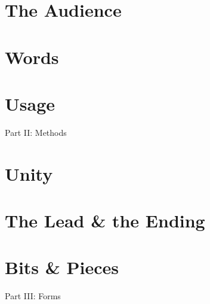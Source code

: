\documentclass{article}
\begin{document}
\section{The Audience}


\section{Words}


\section{Usage}


\begin{center}\huge
	Part II: Methods
\end{center}


\section{Unity}


\section{The Lead \& the Ending}


\section{Bits \& Pieces}


\begin{center}\huge
	Part III: Forms
\end{center}

\end{document}

